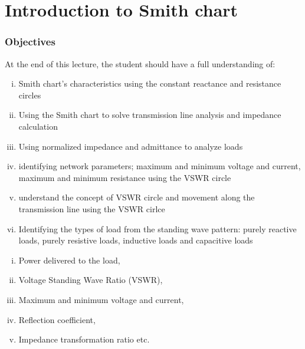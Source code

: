 \chapter{Introduction to Smith chart}\label{lec:lec7}


\begin{mdframed}[ backgroundcolor=lightblue, linewidth=1pt, hidealllines=true]
\subsection{\textbf{Objectives}}
At the end of this lecture, the student should have a full understanding of:
\begin{enumerate}[(i)]
\item Smith chart's characteristics using the constant reactance and resistance circles
\item Using the Smith chart to solve transmission line analysis and impedance calculation
\item Using normalized impedance and admittance to analyze loads
\item identifying network parameters; maximum and minimum voltage and current, maximum  and minimum resistance using the VSWR circle
\item understand the concept of VSWR circle and movement along the transmission line  using the VSWR cirlce
\item Identifying the types of load from the standing wave pattern: purely reactive loads, purely resistive loads, inductive loads and capacitive loads
\end{enumerate}
\end{mdframed}

\vspace{0.7cm}{Previously, we were able to derive equations for different parameters for a transmission line such as;}
\begin{enumerate}[(i)]
\item Power delivered to the load,
\item Voltage Standing Wave Ratio (VSWR),
\item Maximum and minimum voltage and current,
\item Reflection coefficient,
\item Impedance transformation ratio etc.
\end{enumerate}

